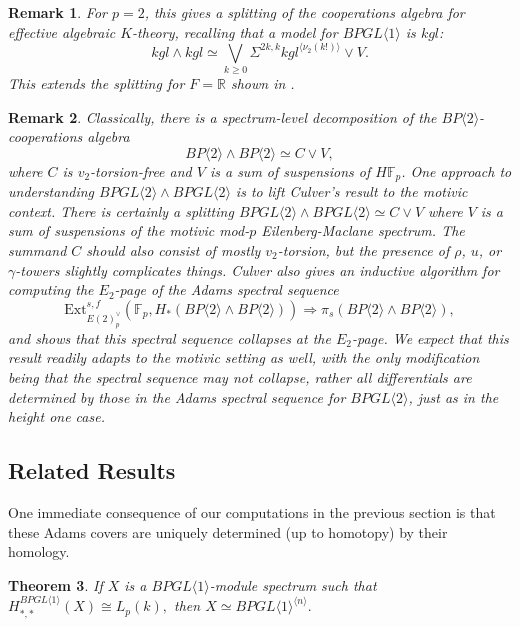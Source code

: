 \documentclass{amsart}
\newtheorem{theorem}{Theorem}[section]
\newtheorem{remark}[theorem]{Remark}
\theoremstyle{plain}
\numberwithin{theorem}{section}
\numberwithin{equation}{section}
\numberwithin{figure}{section}
\newcommand{\mF}{{\mathbb F}}
\newcommand{\0}{\langle 0 \rangle }
\begin{document}
\begin{remark}
    \rm For $p=2$, this gives a splitting of the cooperations algebra for effective algebraic $K$-theory, recalling that a model for $BPGL\langle 1 \rangle$ is $kgl$:
    \[kgl \wedge kgl \simeq \bigvee_{k \geq 0}\Sigma^{2k, k}kgl^{\langle\nu_2(k!)\rangle} \vee V.\]
    This extends the splitting for $F=\mathbb{R}$ shown in \cite{LiPetTat25}.
\end{remark}

\begin{remark}
    \rm Classically, there is a spectrum-level decomposition of the $BP\langle 2 \rangle$-cooperations algebra \cite{culver-bp2coop,CulverOddp20}
    \[BP\langle 2 \rangle\wedge BP \langle 2 \rangle \simeq  C \vee V,\] 
    where $C$ is $v_2$-torsion-free and $V$ is a sum of suspensions of $H\mF_p$. One approach to understanding $BPGL \langle 2 \rangle \wedge BPGL \langle 2 \rangle$ is to lift Culver's result to the motivic context. There is certainly a splitting $BPGL\langle 2 \rangle \wedge BPGL\langle 2 \rangle \simeq C \vee V$ where $V$ is a sum of suspensions of the motivic mod-$p$ Eilenberg-Maclane spectrum. The summand $C$ should also consist of mostly $v_2$-torsion, but the presence of $\rho$, $u$, or $\gamma$-towers slightly complicates things. Culver also gives an inductive algorithm for computing the $E_{2}$-page of the Adams spectral sequence 
    \[\text{Ext}^{s,f}_{E(2)^\vee_p}(\mF_{p}, H_{*}(BP\langle 2 \rangle \wedge BP\langle 2 \rangle)) \Longrightarrow \pi_s(BP\langle 2 \rangle \wedge BP\langle 2 \rangle),\]
    and shows that this spectral sequence collapses at the $E_{2}$-page. We expect that this result readily adapts to the motivic setting as well, with the only modification being that the spectral sequence may not collapse, rather all differentials are determined by those in the Adams spectral sequence for $BPGL\langle 2 \rangle$, just as in the height one case.
\end{remark}

\subsection{Related Results}
One immediate consequence of our computations in the previous section is that these Adams covers are uniquely determined (up to homotopy) by their homology.
\begin{theorem}
\label{prop:UniquenessOfAdamsCoversBPGL1}
    If $X$ is a $BPGL \langle 1 \rangle$-module spectrum such that $H^{BPGL \langle 1 \rangle}_{*,*}(X) \cong L_p(k),$ then $X \simeq BPGL \langle 1 \rangle ^{\langle n \rangle}.$
\end{theorem}
\end{document}
